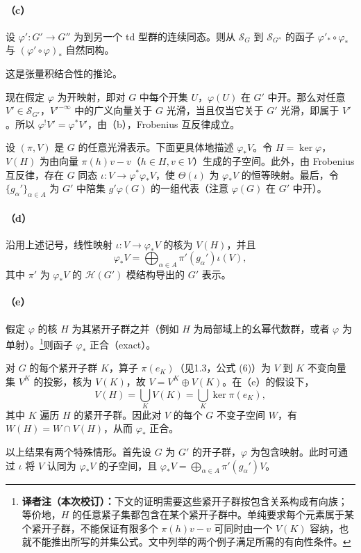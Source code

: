 \paragraph*{（c）}
设 $\varphi':G'\to G''$ 为到另一个 td 型群的连续同态。则从 $\mathcal S_G$ 到 $\mathcal S_{G''}$ 的函子 $\varphi'_*\circ\varphi_*$ 与 $(\varphi'\circ\varphi)_*$ 自然同构。

这是张量积结合性的推论。

现在假定 $\varphi$ 为开映射，即对 $G$ 中每个开集 $U$，$\varphi(U)$ 在 $G'$ 中开。那么对任意 $V'\in\mathcal S_{G'}$，$V'^{-\infty}$ 中的广义向量关于 $G$ 光滑，当且仅当它关于 $G'$ 光滑，即属于 $V'$。所以 $\varphi^!V'=\varphi^*V'$，由（b），Frobenius 互反律成立。

设 $(\pi,V)$ 是 $G$ 的任意光滑表示。下面更具体地描述 $\varphi_*V$。令 $H=\ker\varphi$，$V(H)$ 为由向量 $\pi(h)v-v$（$h\in H,v\in V$）生成的子空间。此外，由 Frobenius 互反律，存在 $G$ 同态 $\iota:V\to\varphi^*\varphi_*V$，使 $\Theta(\iota)$ 为 $\varphi_*V$ 的恒等映射。最后，令 $\{g_\alpha'\}_{\alpha\in A}$ 为 $G'$ 中陪集 $g'\varphi(G)$ 的一组代表（注意 $\varphi(G)$ 在 $G'$ 中开）。
\paragraph*{（d）}
沿用上述记号，线性映射 $\iota:V\to\varphi_*V$ 的核为 $V(H)$，并且
\[
\varphi_*V=\bigoplus_{\alpha\in A}\pi'(g_\alpha')\iota(V),
\]
其中 $\pi'$ 为 $\varphi_*V$ 的 $\mathcal H(G')$ 模结构导出的 $G'$ 表示。
\paragraph*{（e）}
假定 $\varphi$ 的核 $H$ 为其紧开子群之并（例如 $H$ 为局部域上的幺幂代数群，或者 $\varphi$ 为单射）。\footnote{\textbf{译者注（本次校订）：}下文的证明需要这些紧开子群按包含关系构成有向族；等价地，$H$ 的任意紧子集都包含在某个紧开子群中。单纯要求每个元素属于某个紧开子群，不能保证有限多个 $\pi(h)v-v$ 可同时由一个 $V(K)$ 容纳，也就不能推出所写的并集公式。文中列举的两个例子满足所需的有向性条件。}则函子 $\varphi_*$ 正合（exact）。

对 $G$ 的每个紧开子群 $K$，算子 $\pi(e_K)$（见1.3，公式 (6)）为 $V$ 到 $K$ 不变向量集 $V^K$ 的投影，核为 $V(K)$，故 $V=V^K\oplus V(K)$。在（e）的假设下，
\[
V(H)=\bigcup_KV(K)=\bigcup_K\ker\pi(e_K),
\]
其中 $K$ 遍历 $H$ 的紧开子群。因此对 $V$ 的每个 $G$ 不变子空间 $W$，有 $W(H)=W\cap V(H)$，从而 $\varphi_*$ 正合。

以上结果有两个特殊情形。首先设 $G$ 为 $G'$ 的开子群，$\varphi$ 为包含映射。此时可通过 $\iota$ 将 $V$ 认同为 $\varphi_*V$ 的子空间，且 $\varphi_*V=\bigoplus_{\alpha\in A}\pi'(g_\alpha')V$。

